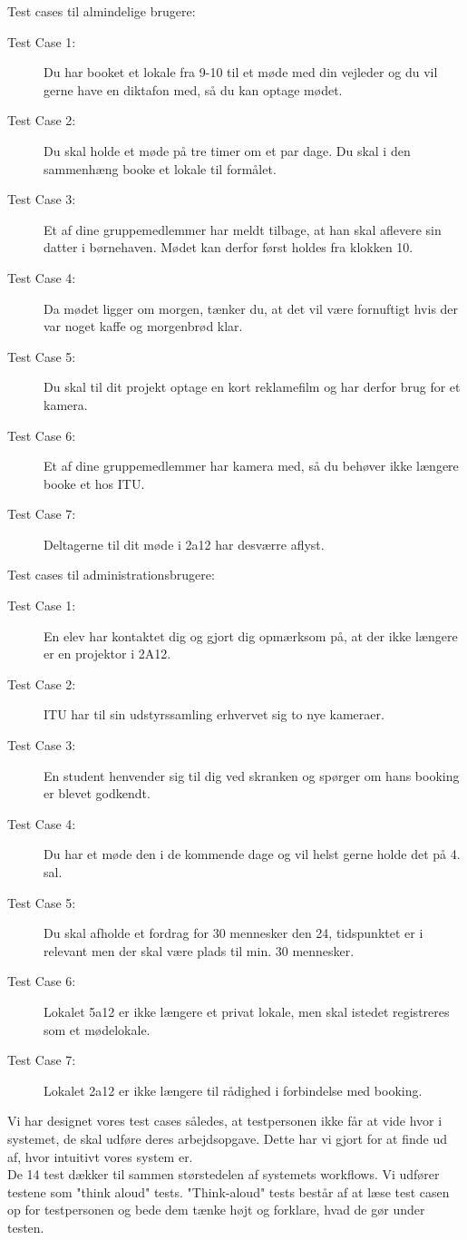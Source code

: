 Test cases til almindelige brugere:
\begin{description}
\item[Test Case 1:] Du har booket et lokale fra 9-10 til et møde med din vejleder og du vil gerne have en diktafon med, så du kan optage mødet.
\item[Test Case 2:] Du skal holde et møde på tre timer om et par dage. Du skal i den sammenhæng booke et lokale til formålet.
\item[Test Case 3:] Et af dine gruppemedlemmer har meldt tilbage, at han skal aflevere sin datter i børnehaven. Mødet kan derfor først holdes fra klokken 10.
\item[Test Case 4:] Da mødet ligger om morgen, tænker du, at det vil være fornuftigt hvis der var noget kaffe og morgenbrød klar.
\item[Test Case 5:] Du skal til dit projekt optage en kort reklamefilm og har derfor brug for et kamera.
\item[Test Case 6:] Et af dine gruppemedlemmer har kamera med, så du behøver ikke længere booke et hos ITU.
\item[Test Case 7:] Deltagerne til dit møde i 2a12 har desværre aflyst.
\end{description}
Test cases til administrationsbrugere:
\begin{description}
\item[Test Case 1:] En elev har kontaktet dig og gjort dig opmærksom på, at der ikke længere er en projektor i 2A12.
\item[Test Case 2:] ITU har til sin udstyrssamling erhvervet sig to nye kameraer.
\item[Test Case 3:] En student henvender sig til dig ved skranken og spørger om hans booking er blevet godkendt.
\item[Test Case 4:] Du har et møde den i de kommende dage og vil helst gerne holde det på 4. sal.
\item[Test Case 5:] Du skal afholde et fordrag for 30 mennesker den 24, tidspunktet er i relevant men der skal være plads til min. 30 mennesker.
\item[Test Case 6:] Lokalet 5a12 er ikke længere et privat lokale, men skal istedet registreres som et mødelokale.
\item[Test Case 7:] Lokalet 2a12 er ikke længere til rådighed i forbindelse med booking.
\end{description}

Vi har designet vores test cases således, at testpersonen ikke får at vide hvor i systemet, de skal udføre deres arbejdsopgave. Dette har vi gjort for at finde ud af, hvor intuitivt vores system er.
\\De 14 test dækker til sammen størstedelen af systemets workflows. Vi udfører testene som "think aloud" tests\cite[s. 421]{SL_UID}. "Think-aloud" tests består af at læse test casen op for testpersonen og bede dem tænke højt og forklare, hvad de gør under testen.


